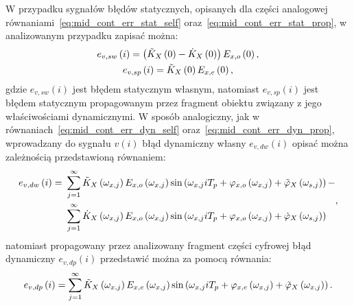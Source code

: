 W przypadku sygnałów błędów statycznych, opisanych dla części analogowej równaniami~\eqref{eq:mid_cont_err_stat_self} oraz~\eqref{eq:mid_cont_err_stat_prop}, w analizowanym przypadku zapisać można:
\begin{gather}
e_{v,sw} \left(i\right) = \left( \tilde{K}_{X} \left(0\right) - \dot{K}_{X} \left(0\right) \right) E_{x,o} \left(0\right) \label{eq:mid_disc_err_stat_self}, \\
e_{v,sp} \left(i\right) = \tilde{K}_{X} \left(0\right) E_{x,e} \left(0\right) \label{eq:mid_disc_err_stat_prop},
\end{gather}
gdzie $e_{v,sw}(i)$ jest błędem statycznym własnym, natomiast $e_{v,sp}(i)$ jest błędem statycznym propagowanym przez fragment obiektu związany z jego właściwościami dynamicznymi. W sposób analogiczny, jak w równaniach~\eqref{eq:mid_cont_err_dyn_self} oraz~\eqref{eq:mid_cont_err_dyn_prop}, wprowadzany do sygnału $v(i)$ błąd dynamiczny własny $e_{v,dw}(i)$ opisać można zależnością przedstawioną równaniem:
\begin{equation}
\begin{split}
e_{v,dw} \left(i\right) =~
& \sum _{j = 1} ^{\infty} \tilde{K}_{X} \left(\omega_{x,j}\right) E_{x,o} \left(\omega_{x,j}\right) \sin \left( \omega_{x,j} iT_{p} + \varphi_{x,o} \left(\omega_{x,j}\right) + \tilde{\varphi}_{X} \left(\omega_{s,j}\right) \right) - \\
& \sum _{j = 1} ^{\infty} \dot{K}_{X} \left(\omega_{x,j}\right) E_{x,o} \left(\omega_{x,j}\right) \sin \left( \omega_{x,j} iT_{p} + \varphi_{x,o} \left(\omega_{x,j}\right) + \dot{\varphi}_{X} \left(\omega_{s,j}\right) \right)
\end{split}
\label{eq:mid_disc_err_dyn_self},
\end{equation}
natomiast propagowany przez analizowany fragment części cyfrowej błąd dynamiczny $e_{v,dp}(i)$ przedstawić można za pomocą równania:
\begin{equation}
e_{v,dp} \left(i\right) = \sum _{j = 1} ^{\infty} \tilde{K}_{X} \left(\omega_{x,j}\right) E_{x,e} \left(\omega_{x,j}\right) \sin \left( \omega_{x,j} iT_{p} + \varphi_{x,e} \left(\omega_{x,j}\right) + \tilde{\varphi}_{X} \left(\omega_{x,j}\right) \right) \label{eq:mid_disc_err_dyn_prop}.
\end{equation}

